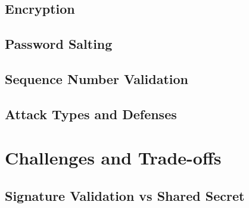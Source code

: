 \documentclass{sig-alternate}
\renewcommand\_{\textunderscore\allowbreak}  %
\begin{document}
\subsection{Encryption}

\subsection{Password Salting}

\subsection{Sequence Number Validation}

\subsection{Attack Types and Defenses}
	
\section{Challenges and Trade-offs}

\subsection{Signature Validation vs Shared Secret}
\end{document}
